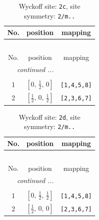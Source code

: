\documentclass[fleqn,8pt]{jsarticle}
\begin{document}
\renewcommand{\arraystretch}{1.2}
\begin{longtable}{ccc}
\caption{Wyckoff site: {\tt 2c}, site symmetry: {\tt 2/m..}}
 \\
 \hline \hline
No. & position & mapping \\ \hline \endfirsthead

\multicolumn{2}{l}{\tablename\ \thetable{}} \\
 \hline \hline
No. & position & mapping \\ \hline \endhead

 \hline \hline
\multicolumn{2}{r}{\footnotesize\it continued ...} \\ \endfoot

 \hline \hline
\multicolumn{2}{r}{} \\ \endlastfoot

1 & $\left[ 0,\, \frac{1}{2},\, 0 \right]$ & {\tt [1,4,5,8]} \\ \hline
2 & $\left[ \frac{1}{2},\, 0,\, \frac{1}{2} \right]$ & {\tt [2,3,6,7]} \\
\end{longtable}
\renewcommand{\arraystretch}{1.2}
\begin{longtable}{ccc}
\caption{Wyckoff site: {\tt 2d}, site symmetry: {\tt 2/m..}}
 \\
 \hline \hline
No. & position & mapping \\ \hline \endfirsthead

\multicolumn{2}{l}{\tablename\ \thetable{}} \\
 \hline \hline
No. & position & mapping \\ \hline \endhead

 \hline \hline
\multicolumn{2}{r}{\footnotesize\it continued ...} \\ \endfoot

 \hline \hline
\multicolumn{2}{r}{} \\ \endlastfoot

1 & $\left[ 0,\, \frac{1}{2},\, \frac{1}{2} \right]$ & {\tt [1,4,5,8]} \\ \hline
2 & $\left[ \frac{1}{2},\, 0,\, 0 \right]$ & {\tt [2,3,6,7]} \\
\end{longtable}
\renewcommand{\arraystretch}{1.2}
\end{document}
